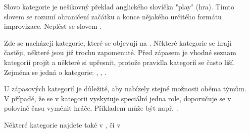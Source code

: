 \documentclass[main.tex]{subfiles}
\begin{document}
\needspace{5cm} \label{kategorie} Slovo kategorie je nešikovný překlad anglického slovíčka "play"{} (hra). Tímto slovem se rozumí ohraničení začátku a konce nějakého určitého formátu improvizace. Neplést se slovem .  
 
 
\needspace{5cm} \label{kategorie:zápasové kategorie} Zde se nacházejí kategorie, které se objevují na  . Některé kategorie se hrají častěji, některé jsou již trochu zapomenuté. Před zápasem je vhodné seznam kategorií projít a některé si upřesnit, protože pravidla kategorií se často liší. Zejména se jedná o kategorie: , , . 
 
U zápasových kategorií je důležité, aby nabízely stejné možnosti oběma týmům. V případě, že se v kategorii vyskytuje speciální jedna role, doporučuje se v polovině času vyměnit hráče. Příkladem může být např. .  
 
 
Některé kategorie najdete také v  , či v  
 
 
 
\end{document}
